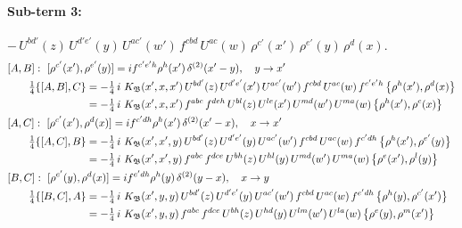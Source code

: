\documentclass[10pt]{article}
\numberwithin{equation}{section}
\begin{document}
\paragraph{Sub-term 3:} $-\,U^{bd'}(z)\,U^{d'e'}(y)\,U^{ac'}(w')\,f^{cbd}\,U^{ac}(w)\,\rho^{c'}(x')\,\rho^{e'}(y)\,\rho^{d}(x)$.
\begin{align}
&[A,B]:\ [\rho^{c'}(x'),\rho^{e'}(y)]=i f^{c'e'h}\rho^{h}(x')\,\delta^{(2)}(x'-y),\quad y\to x'\notag\\
&\qquad \tfrac14\{[A,B],C\}=-\tfrac14\,i\,\,K_{\mathfrak B}(x',x,x')\,U^{bd'}(z)\,U^{d'e'}(x')\,U^{ac'}(w')\,f^{cbd}\,U^{ac}(w)\,f^{c'e'h}\,\big\{\rho^{h}(x'),\rho^{d}(x)\big\}\notag\\
&\qquad\phantom{\tfrac14\{[A,B],C\}}=-\tfrac14\,i\,\,K_{\mathfrak B}(x',x,x')\,f^{abc}\,f^{deh}\,U^{bl}(z)\,U^{le}(x')\,U^{md}(w')\,U^{ma}(w)\,\big\{\rho^{h}(x'),\rho^{c}(x)\big\}
\label{R:eq:GIII.I-3-AB}\\
&[A,C]:\ [\rho^{c'}(x'),\rho^{d}(x)]=i f^{c'dh}\rho^{h}(x')\,\delta^{(2)}(x'-x),\quad x\to x'\notag\\
&\qquad \tfrac14\{[A,C],B\}=-\tfrac14\,i\,\,K_{\mathfrak B}(x',x',y)\,U^{bd'}(z)\,U^{d'e'}(y)\,U^{ac'}(w')\,f^{cbd}\,U^{ac}(w)\,f^{c'dh}\,\big\{\rho^{h}(x'),\rho^{e'}(y)\big\}\notag\\
&\qquad\phantom{\tfrac14\{[A,C],B\}}=-\tfrac14\,i\,\,K_{\mathfrak B}(x',x',y)\,f^{abc}\,f^{dce}\,U^{bh}(z)\,U^{hl}(y)\,U^{md}(w')\,U^{ma}(w)\,\big\{\rho^{e}(x'),\rho^{l}(y)\big\}
\label{R:eq:GIII.I-3-AC}\\
&[B,C]:\ [\rho^{e'}(y),\rho^{d}(x)]=i f^{e'dh}\rho^{h}(y)\,\delta^{(2)}(y-x),\quad x\to y\notag\\
&\qquad \tfrac14\{[B,C],A\}=-\tfrac14\,i\,\,K_{\mathfrak B}(x',y,y)\,U^{bd'}(z)\,U^{d'e'}(y)\,U^{ac'}(w')\,f^{cbd}\,U^{ac}(w)\,f^{e'dh}\,\big\{\rho^{h}(y),\rho^{c'}(x')\big\}\notag\\
&\qquad\phantom{\tfrac14\{[B,C],A\}}=-\tfrac14\,i\,\,K_{\mathfrak B}(x',y,y)\,f^{abc}\,f^{dce}\,U^{bh}(z)\,U^{hd}(y)\,U^{lm}(w')\,U^{la}(w)\,\big\{\rho^{e}(y),\rho^{m}(x')\big\}
\label{R:eq:GIII.I-3-BC}
\end{align}
\end{document}
